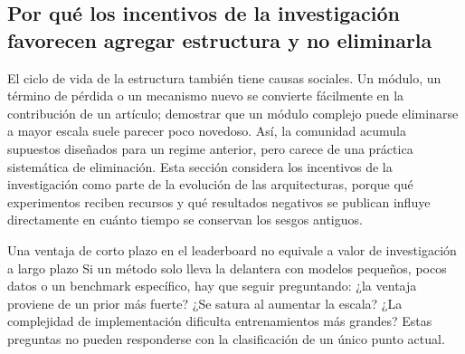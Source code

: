 
\subsection{Por qué los incentivos de la investigación favorecen agregar estructura y no eliminarla}

El ciclo de vida de la estructura también tiene causas sociales. Un módulo, un término de pérdida o un mecanismo nuevo se convierte fácilmente en la contribución de un artículo; demostrar que un módulo complejo puede eliminarse a mayor escala suele parecer poco novedoso. Así, la comunidad acumula supuestos diseñados para un regime anterior, pero carece de una práctica sistemática de eliminación. Esta sección considera los incentivos de la investigación como parte de la evolución de las arquitecturas, porque qué experimentos reciben recursos y qué resultados negativos se publican influye directamente en cuánto tiempo se conservan los sesgos antiguos.


\begin{warningbox}{Una ventaja de corto plazo en el leaderboard no equivale a valor de investigación a largo plazo}
Si un método solo lleva la delantera con modelos pequeños, pocos datos o un benchmark específico, hay que seguir preguntando: ¿la ventaja proviene de un prior más fuerte? ¿Se satura al aumentar la escala? ¿La complejidad de implementación dificulta entrenamientos más grandes? Estas preguntas no pueden responderse con la clasificación de un único punto actual.
\end{warningbox}



